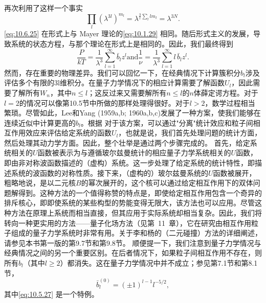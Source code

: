 再次利用了这样一个事实
\begin{equation}\tag{10.6.25}\label{eq:10.6.25}
\prod _ { l } ( \lambda ^{3 l} ) ^{m _ { l} } = \lambda ^{\frac { 3} { l } \sum _ { l } l m _ { l } } = \lambda ^{3 N} .
\end{equation}
\autoref{eq:10.6.25} 在形式上与 Mayer 理论的\autoref{eq:10.1.29} 相同。随后形式主义的发展，导致系统的状态方程，与那个理论在形式上是相同的。因此，我们最终得到
\begin{equation}\tag{10.6.26}\label{eq:10.6.26}
{ \frac { P } { k T } } = { \frac { 1 } { \lambda ^{3} } } \sum _ { l = 1 } ^{\infty} { \bar { b } } _ { l } z ^{l}  { \mathrm { a n d } }  { \frac { 1 } { \nu } } = { \frac { 1 } { \lambda ^{3} } } \sum _ { l = 1 } ^{\infty} l \, { \bar { b } } _ { l } z ^{l} .
\end{equation}
然而，存在重要的物理差异。我们可以回忆一下，在经典情况下计算簇积分\(b_{l}\)涉及评估多个有限的3l维积分。在量子力学情况下的相应计算需要了解函数\(U_{l}\)，因此需要了解所有\(W_{n}\)，其中\(n \leq l\)；这反过来又需要解所有\(n \leq l\)的\(n\)体薛定谔方程。对于\(l=2\)的情况可以像第10.5节中所做的那样处理得很好。对于\(l>2\)，数学过程相当繁琐。尽管如此，Lee和Yang (1959a,b; 1960a,b,c)发展了一种方案，使我们能够在连续近似中计算更高的\(b_{l}\)。根据
对于该方案，可以通过"分离"统计效应和粒子间相互作用效应来评估给定系统的函数\(U_{l}\)，也就是说，我们首先处理问题的统计方面，然后处理其动力学方面。因此，整个壮举是通过两个步骤完成的。
首先，给定系统相关的\(U\)函数被表示为与遵循玻尔兹曼统计的相应量子力学系统相关的\(U\)函数，即由非对称波函数描述的（虚构）系统。这一步处理了给定系统的统计特性，即描述系统的波函数的对称性质。接下来，（虚构的）玻尔兹曼系统的\(U\)函数被展开，粗略地说，是以二元核\(B\)的幂次展开的，这个核可以通过给定相互作用下的双体问题解得到。这种方法的一个值得称赞的特点是，即使给定相互作用包含一个奇异的排斥核心，即即使系统的某些构型的势能变得无限大，该方法也可以应用。尽管这种方法在原理上系统而相当直接，但其应用于实际系统却相当复杂。因此，我们将转向一种更实用的方法——量子化场方法（见第~11~章），它在研究由相互作用粒子组成的量子力学系统时非常有用。关于李和杨的（二元碰撞）方法的详细阐述，请参见本书第一版的第9.7节和第9.8节。
顺便提一下，我们注意到量子力学情况与经典情况之间的另一个重要区别。在后者情况下，如果粒子间相互作用不存在，则所有\(b_{l}\)（其中\(l \geq 2\)）都消失。这在量子力学情况中并不成立；参见第7.1节和第8.1节，
\begin{equation}\tag{10.6.27}\label{eq:10.6.27}
\bar { b } _ { l } ^{( 0 )} = ( \pm 1 ) ^{l - 1} l ^{- 5 / 2} ,
\end{equation}
其中\autoref{eq:10.5.27} 是一个特例。
